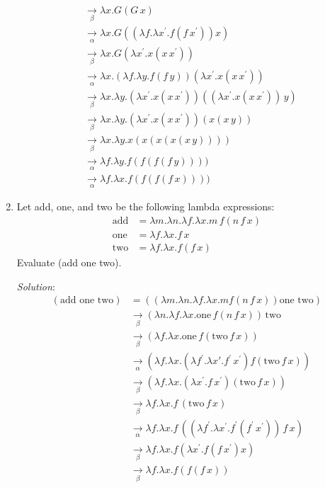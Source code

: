 \documentclass[]{article}
\begin{document}
\begin{enumerate}
\begin{align*}
&\underset{\beta}{\rightarrow} \lambda x.G(G\,x) \\
&\underset{\alpha}{\rightarrow} \lambda x.G((\lambda f.\lambda
x^\prime.f(f\,x^\prime)) x) \\
&\underset{\beta}{\rightarrow} \lambda x.G(\lambda x^\prime.x(x\,x^\prime)) \\
&\underset{\alpha}{\rightarrow} \lambda x.(\lambda f.\lambda y.f(f\,y))(\lambda
x^\prime.x(x\,x^\prime)) \\
&\underset{\beta}{\rightarrow} \lambda x.\lambda y.(\lambda
x^\prime.x(x\,x^\prime))((\lambda x^\prime.x(x\,x^\prime))\,y) \\
&\underset{\beta}{\rightarrow} \lambda x.\lambda y.(\lambda
x^\prime.x(x\,x^\prime)) (x(x\,y)) \\
&\underset{\beta}{\rightarrow} \lambda x.\lambda y.x(x(x(x(x\,y))))\\
&\underset{\alpha}{\rightarrow} \lambda f.\lambda y.f(f(f(f\,y)))) \\
&\underset{\alpha}{\rightarrow} \lambda f.\lambda x.f(f(f(f\,x))))
\end{align*}

\item Let add, one, and two be the following lambda expressions:
\begin{align*}
\text{add} &= \lambda m.\lambda n.\lambda f.\lambda x.m\,f(n\,f\,x) \\
\text{one} &= \lambda f.\lambda x.f\,x \\
\text{two} &= \lambda f.\lambda x.f(f\,x)
\end{align*}
Evaluate (add one two).
\item[\emph{Solution}:]
\begin{align*}
(\textrm{add one two}) &=((\lambda m.\lambda n.\lambda f.\lambda x.m
f(n\,f\,x))\textrm{one}\,\,\text{two})\\
&\underset{\beta}{\rightarrow}(\lambda n.\lambda f.\lambda
x.\textrm{one}\,f(n\,f\,x))\,\textrm{two} \\
&\underset{\beta}{\rightarrow}(\lambda f.\lambda
x.\textrm{one}\,f(\textrm{two}\,f\,x)) \\
&\underset{\alpha}{\rightarrow}(\lambda f.\lambda x.(\lambda f^\prime.\lambda
x\prime.f^\prime\,x^\prime)f(\textrm{two}\,f\,x)) \\
&\underset{\beta}{\rightarrow} (\lambda f.\lambda x.(\lambda
x^\prime.f\,x^\prime)(\textrm{two}\,f\,x)) \\
&\underset{\beta}{\rightarrow} \lambda f.\lambda x.f\,(\textrm{two}\,f\,x) \\
&\underset{\alpha}{\rightarrow} \lambda f.\lambda x.f\,((\lambda
f^\prime.\lambda x^\prime.f^\prime(f^\prime\,x^\prime))\,f\,x) \\
&\underset{\beta}{\rightarrow} \lambda f.\lambda x.f (\lambda
x^\prime.f(f\,x^\prime) x) \\
&\underset{\beta}{\rightarrow} \lambda f.\lambda x.f(f(f\,x))
\end{align*}
\end{enumerate}
\end{document}
